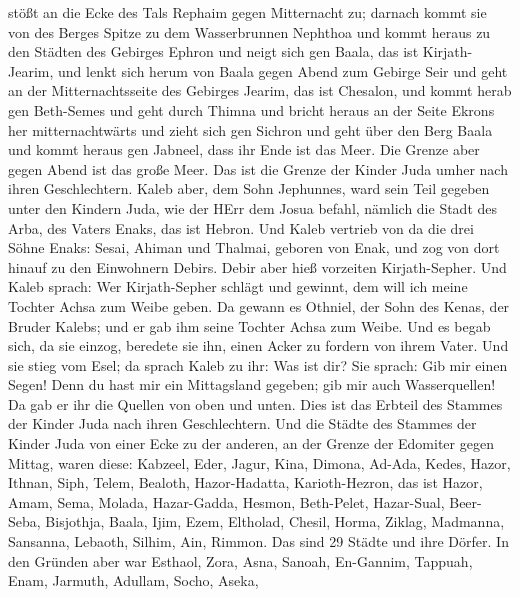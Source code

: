 stößt an die Ecke des Tals Rephaim gegen Mitternacht zu; 
darnach kommt sie von des Berges Spitze zu dem Wasserbrunnen Nephthoa
und kommt heraus zu den Städten des Gebirges Ephron und neigt sich gen
Baala, das ist Kirjath-Jearim,  und lenkt sich herum von
Baala gegen Abend zum Gebirge Seir und geht an der Mitternachtsseite des
Gebirges Jearim, das ist Chesalon, und kommt herab gen Beth-Semes und
geht durch Thimna  und bricht heraus an der Seite Ekrons
her mitternachtwärts und zieht sich gen Sichron und geht über den Berg
Baala und kommt heraus gen Jabneel, dass ihr Ende ist das Meer.
 Die Grenze aber gegen Abend ist das große Meer. Das ist
die Grenze der Kinder Juda umher nach ihren Geschlechtern. 
Kaleb aber, dem Sohn Jephunnes, ward sein Teil gegeben unter den Kindern
Juda, wie der HErr dem Josua befahl, nämlich die Stadt des Arba, des
Vaters Enaks, das ist Hebron.  Und Kaleb vertrieb von da
die drei Söhne Enaks: Sesai, Ahiman und Thalmai, geboren von Enak,
 und zog von dort hinauf zu den Einwohnern Debirs. Debir
aber hieß vorzeiten Kirjath-Sepher.  Und Kaleb sprach: Wer
Kirjath-Sepher schlägt und gewinnt, dem will ich meine Tochter Achsa zum
Weibe geben.  Da gewann es Othniel, der Sohn des Kenas, der
Bruder Kalebs; und er gab ihm seine Tochter Achsa zum Weibe.
 Und es begab sich, da sie einzog, beredete sie ihn, einen
Acker zu fordern von ihrem Vater. Und sie stieg vom Esel; da sprach
Kaleb zu ihr: Was ist dir?  Sie sprach: Gib mir einen
Segen! Denn du hast mir ein Mittagsland gegeben; gib mir auch
Wasserquellen! Da gab er ihr die Quellen von oben und unten.
 Dies ist das Erbteil des Stammes der Kinder Juda nach
ihren Geschlechtern.  Und die Städte des Stammes der Kinder
Juda von einer Ecke zu der anderen, an der Grenze der Edomiter gegen
Mittag, waren diese: Kabzeel, Eder, Jagur,  Kina, Dimona,
Ad-Ada,  Kedes, Hazor, Ithnan,  Siph, Telem,
Bealoth,  Hazor-Hadatta, Karioth-Hezron, das ist Hazor,
 Amam, Sema, Molada,  Hazar-Gadda, Hesmon,
Beth-Pelet,  Hazar-Sual, Beer-Seba, Bisjothja,
 Baala, Ijim, Ezem,  Eltholad, Chesil, Horma,
 Ziklag, Madmanna, Sansanna,  Lebaoth, Silhim,
Ain, Rimmon. Das sind 29 Städte und ihre Dörfer.  In den
Gründen aber war Esthaol, Zora, Asna,  Sanoah, En-Gannim,
Tappuah, Enam,  Jarmuth, Adullam, Socho, Aseka,
